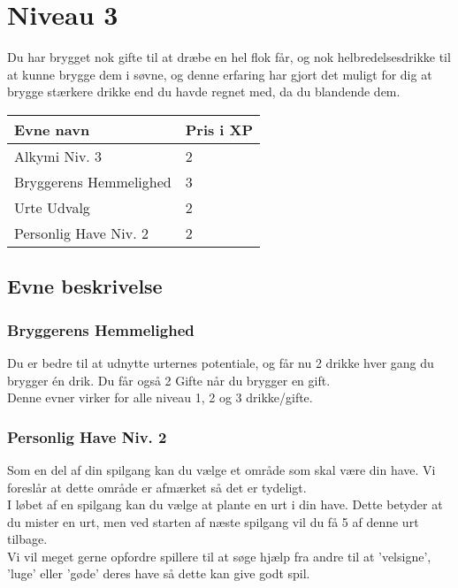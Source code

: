 \chapter{Niveau 3}
Du har brygget nok gifte til at dræbe en hel flok får, og nok helbredelsesdrikke til at kunne brygge dem i søvne, og denne erfaring har gjort det muligt for dig at brygge stærkere drikke end du havde regnet med, da du blandende dem.

\begin{table}[H]
    \centering
    \begin{tabular}{|p{}|p{}|}
    \rowcolor{cerulean!80}\hline
        Evne navn & Pris i XP \\\hline
        Alkymi Niv. 3 & 2\\\hline
        Bryggerens Hemmelighed & 3\\\hline
        Urte Udvalg & 2\\\hline
        Personlig Have Niv. 2 & 2\\
         \hline
    \end{tabular}
\end{table}
\section{Evne beskrivelse}




\subsection{Bryggerens Hemmelighed}
Du er bedre til at udnytte urternes potentiale, og får nu 2 drikke hver gang du brygger én drik. Du får også 2 Gifte når du brygger en gift.\\
Denne evner virker for alle niveau 1, 2 og 3 drikke/gifte.\\




\subsection{Personlig Have Niv. 2}
Som en del af din spilgang kan du vælge et område som skal være din have. Vi foreslår at dette område er afmærket så det er tydeligt.\\
I løbet af en spilgang kan du vælge at plante en urt i din have. Dette betyder at du mister en urt, men ved starten af næste spilgang vil du få 5 af denne urt tilbage.\\
Vi vil meget gerne opfordre spillere til at søge hjælp fra andre til at 'velsigne', 'luge' eller 'gøde' deres have så dette kan give godt spil.\\
